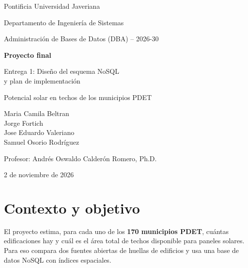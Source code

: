 \documentclass[11pt,a4paper]{article}
\begin{document}
\begin{titlepage}
  \centering
  {\large Pontificia Universidad Javeriana\par}
  {\large Departamento de Ingeniería de Sistemas\par}
  \vspace{0.8cm}
  {\large Administración de Bases de Datos (DBA) -- 2026-30\par}
  \vspace{2.5cm}
  {\Huge\bfseries Proyecto final\par}
  \vspace{1cm}
  {\LARGE Entrega 1: Diseño del esquema NoSQL\\ y plan de implementación\par}
  \vspace{1cm}
  {\large Potencial solar en techos de los municipios PDET\par}
  \vspace{3cm}
  {\large
    Maria Camila Beltran \\
    \vspace{0.5cm}
    Jorge Fortich \\
    \vspace{0.5cm}
    Jose Eduardo Valeriano \\
    \vspace{0.5cm}
    Samuel Osorio Rodríguez\par}
  \vspace{3cm}
  {\large Profesor: Andrés Oswaldo Calderón Romero, Ph.D.\par}
  \vspace{3cm}
  {\large 2 de noviembre de 2026\par}
\end{titlepage}

\tableofcontents
\newpage

\section{Contexto y objetivo}
\label{sec:contexto}

El proyecto estima, para cada uno de los \textbf{170 municipios PDET}, cuántas
edificaciones hay y cuál es el área total de techos disponible para paneles
solares. Para eso compara dos fuentes abiertas de huellas de edificios y usa
una base de datos NoSQL con índices espaciales.
\end{document}

